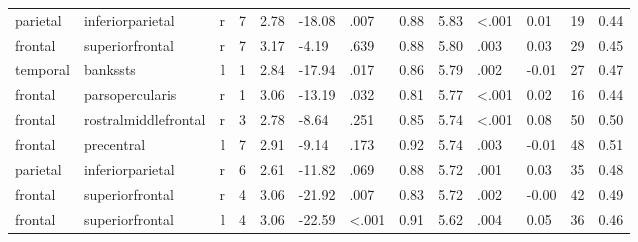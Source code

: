 \documentclass{article}
\begin{document}
\begin{longtable}{llrR{1.3cm}R{1cm}R{1.3cm}R{1cm}R{1cm}R{1.3cm}R{1cm}R{1.8cm}R{1.3cm}R{1.8cm}}
  parietal &          inferiorparietal &    r &         7 &                  2.78 &           -18.08 &               .007 &                               0.88 &                          5.83 &                   \textless.001 &   0.01 &     19 &      0.44 \\
   frontal &           superiorfrontal &    r &         7 &                  3.17 &            -4.19 &               .639 &                               0.88 &                          5.80 &                            .003 &   0.03 &     29 &      0.45 \\
  temporal &                  bankssts &    l &         1 &                  2.84 &           -17.94 &               .017 &                               0.86 &                          5.79 &                            .002 &  -0.01 &     27 &      0.47 \\
   frontal &           parsopercularis &    r &         1 &                  3.06 &           -13.19 &               .032 &                               0.81 &                          5.77 &                   \textless.001 &   0.02 &     16 &      0.44 \\
   frontal &      rostralmiddlefrontal &    r &         3 &                  2.78 &            -8.64 &               .251 &                               0.85 &                          5.74 &                   \textless.001 &   0.08 &     50 &      0.50 \\
   frontal &                precentral &    l &         7 &                  2.91 &            -9.14 &               .173 &                               0.92 &                          5.74 &                            .003 &  -0.01 &     48 &      0.51 \\
  parietal &          inferiorparietal &    r &         6 &                  2.61 &           -11.82 &               .069 &                               0.88 &                          5.72 &                            .001 &   0.03 &     35 &      0.48 \\
   frontal &           superiorfrontal &    r &         4 &                  3.06 &           -21.92 &               .007 &                               0.83 &                          5.72 &                            .002 &  -0.00 &     42 &      0.49 \\
   frontal &           superiorfrontal &    l &         4 &                  3.06 &           -22.59 &      \textless.001 &                               0.91 &                          5.62 &                            .004 &   0.05 &     36 &      0.46 \\

\end{longtable}
\end{document}
